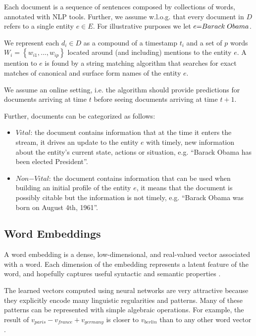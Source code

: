 \documentclass{article}
\begin{document}
Each document is a sequence of sentences composed by collections of words, annotated with NLP tools.
Further, we assume w.l.o.g. that every document in $D$ refers to a single entity $e \in E$. For illustrative purposes we let $e\mathord{=}Barack\hspace{1mm}Obama$.

We represent each $d_i \in D$ as a compound of a timestamp $t_i$ and a set of $p$ words $W_i = \left\{ {w_{i1}, ..., w_{ip}}\right\}$ located around (and including) mentions to the entity $e$. A mention to $e$ is found by a string matching algorithm that searches for exact matches of canonical and surface form names of the entity $e$.

We assume an online setting, i.e. the algorithm should provide predictions for documents arriving at time $t$ before seeing documents arriving at time $t+1$.

Further, documents can be categorized as follows:

\begin{itemize}
    \item $Vital$: the document contains information that at the time it enters the stream, it drives an update to the entity $e$ with timely, new information about the entity's current state, actions or situation, e.g. ``Barack Obama has been elected President''.
    \item $Non\mathord{-}Vital$: the document contains information that can be used when building an initial profile of the entity $e$, it means that the document is possibly citable but the information is not timely, e.g. ``Barack Obama was born on August 4th, 1961''.
\end{itemize}

\subsection{Word Embeddings}
\label{emb}

A word embedding is a dense, low-dimensional, and real-valued vector associated with a word. Each dimension of the embedding represents a latent feature of the word, and hopefully captures useful syntactic and semantic properties \cite{Turian10wordrepresentations}.

The learned vectors computed using neural networks are very attractive because they explicitly encode many linguistic regularities and patterns. Many of these patterns can be represented with simple algebraic operations. For example, the result of $v_{paris} - v_{france} + v_{germany}$ is closer to $v_{berlin}$ than to any other word vector \cite{mikolovChen,mikolovYih}.
\end{document}
